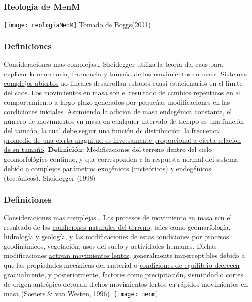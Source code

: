 \documentclass{beamer}
\begin{document}
\begin{frame}
\frametitle{Reología de MenM}
\centering
   	\texttt{[image: reologiaMenM]} 
\tiny{Tomado de Boggs(2001)}
\end{frame}
\begin{frame}
\frametitle{Definiciones}
Consideraciones mas complejas…
\vfill
\justifying
Sheidegger utiliza la teoría del caos para explicar la ocurrencia, frecuencia y tamaño de los movimientos en masa. \uline{Sistemas complejos abiertos} no lineales desarrollan estados cuasi-estacionarios en el limite del caos. Los movimientos en masa son el resultado de cambios repentinos en el comportamiento a largo plazo generados por pequeñas modificaciones en las condiciones iniciales. Asumiendo la adición de masa endogénica constante, el número de movimientos en masa en cualquier intervalo de tiempo es una función del tamaño, la cual debe seguir una función de distribución: \uline{la frecuencia promedio de una cierta magnitud es inversamente proporcional a cierta relación de su tamaño}.
\vfill
\textbf{Definición}: Modificaciones del terreno dentro del ciclo geomorfológico continuo, y que corresponden a la respuesta normal del sistema debido a complejos parámetros exogénicos (meteóricos) y endogénicos (tectónicos). Sheidegger (1998) 
\end{frame}
\begin{frame}
\frametitle{Definiciones}
Consideraciones mas complejas…
\vfill
\justifying
Los procesos de movimiento en masa son el resultado de las \uline{condiciones naturales del terreno}, tales como geomorfología, hidrología y geología, y las \uline{modificaciones de estas condiciones} por procesos geodinámicos, vegetación, usos del suelo y actividades humanas. Dichas modificaciones \uline{activan movimientos lentos}, generalmente imperceptibles debido a que las propiedades mecánicas del material o \uline{condiciones de equilibrio decrecen gradualmente}, y posteriormente, factores como precipitación, sismicidad o cortes de origen antrópico \uline{detonan dichos movimientos lentos en rápidos movimientos en masa} (Soeters \& van Westen, 1996).
\vfill
\texttt{[image: menm]}
\end{frame}
\end{document}
